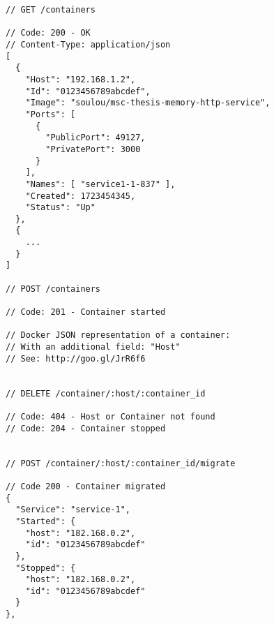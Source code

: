 \begin{lstlisting}
// GET /containers

// Code: 200 - OK
// Content-Type: application/json
[
  {
    "Host": "192.168.1.2",
    "Id": "0123456789abcdef",
    "Image": "soulou/msc-thesis-memory-http-service",
    "Ports": [
      {
        "PublicPort": 49127,
        "PrivatePort": 3000
      }
    ],
    "Names": [ "service1-1-837" ],
    "Created": 1723454345,
    "Status": "Up"
  },
  {
    ...
  }
]

// POST /containers

// Code: 201 - Container started

// Docker JSON representation of a container:
// With an additional field: "Host"
// See: http://goo.gl/JrR6f6


// DELETE /container/:host/:container_id

// Code: 404 - Host or Container not found
// Code: 204 - Container stopped


// POST /container/:host/:container_id/migrate

// Code 200 - Container migrated
{
  "Service": "service-1",
  "Started": {
    "host": "182.168.0.2",
    "id": "0123456789abcdef"
  },
  "Stopped": {
    "host": "182.168.0.2",
    "id": "0123456789abcdef"
  }
},

\end{lstlisting}
